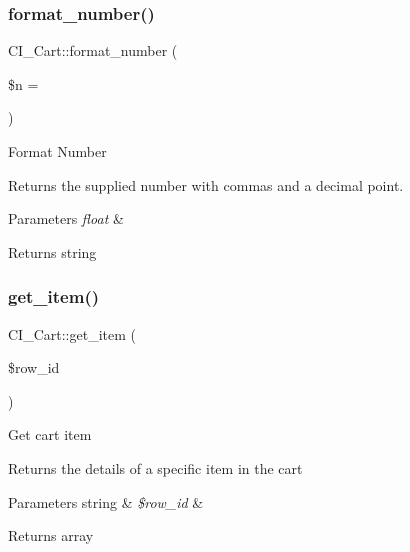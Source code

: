 \subsubsection{\texorpdfstring{format\+\_\+number()}{format\_number()}}
{\footnotesize\ttfamily C\+I\+\_\+\+Cart\+::format\+\_\+number (\begin{DoxyParamCaption}\item[{}]{\$n = {\ttfamily \textquotesingle{}\textquotesingle{}} }\end{DoxyParamCaption})}

Format Number

Returns the supplied number with commas and a decimal point.


\begin{DoxyParams}{Parameters}
{\em float} & \\
\hline
\end{DoxyParams}
\begin{DoxyReturn}{Returns}
string 
\end{DoxyReturn}
\mbox{\label{class_c_i___cart_a26c1e78928a44090df549fdf86c82ec8}} 
\subsubsection{\texorpdfstring{get\+\_\+item()}{get\_item()}}
{\footnotesize\ttfamily C\+I\+\_\+\+Cart\+::get\+\_\+item (\begin{DoxyParamCaption}\item[{}]{\$row\+\_\+id }\end{DoxyParamCaption})}

Get cart item

Returns the details of a specific item in the cart


\begin{DoxyParams}[1]{Parameters}
string & {\em \$row\+\_\+id} & \\
\hline
\end{DoxyParams}
\begin{DoxyReturn}{Returns}
array 
\end{DoxyReturn}
\mbox{\label{class_c_i___cart_a4b13905bb2ac799b2572eb06bd106e11}} 
